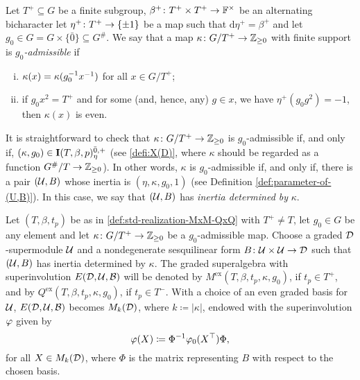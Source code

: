 
\begin{defi}\label{defi:odd-D-kappa-g_0-admissible}
    Let $T^+ \subseteq G$ be a finite subgroup, $\beta^+\colon T^+\times T^+ \to \mathbb{F}^\times$ be an alternating bicharacter let $\eta^+\colon T^+ \to \{ \pm 1 \}$ be a map such that $\mathrm{d}\eta^+ = \beta^+$ and let $g_0 \in G = G \times \{ \bar 0 \} \subseteq G^\#$. 
    We say that a map $\kappa\colon G/T^+ \to \mathbb{Z}_{\geq 0}$ with finite support is \emph{$g_0$-admissible} if
	\begin{enumerate}[(i)]
		\item $\kappa(x) = \kappa(g_0^{-1} x^{-1})$ for all $x \in G/T^+$;
		\item if $g_0 x^2 = T^+$ and 
		for some (and, hence, any) $g\in x$, we have $\eta^+(g_0g^2) = -1$, then $\kappa (x)$ is even.
	\end{enumerate}
\end{defi}

It is straightforward to check that $\kappa\colon G/T^+ \to \mathbb{Z}_{\geq 0}$ is $g_0$-admissible if, and only if, $(\kappa, g_0) \in \mathbf{I}(T,\beta,p)^{{\bar{0}}, +}_\eta$ (see \cref{defi:X(D)}, where $\kappa$ should be regarded as a function $G^\#/T \to \mathbb{Z}_{\geq 0}$). 
In other words, $\kappa$ is $g_0$-admissible if, and only if, there is a pair $(\mathcal U, B)$ whose inertia is $(\eta, \kappa, g_0, 1)$ (see Definition \ref{def:parameter-of-(U,B)}). 
In this case, we say that $(\mathcal U, B)$ has \emph{inertia determined by} $\kappa$. 

\begin{defi}\label{def:model-grd-MxM-odd-or-QxQ}
    Let $(T, \beta, t_p)$ be as in \cref{def:std-realization-MxM-QxQ} with $T^+ \neq T$, 
    let $g_0 \in G$ be any element and
    let $\kappa\colon G/T^+ \to \mathbb{Z}_{\geq 0}$ be a $g_0$-admissible map.
    Choose a graded $\mathcal{D}$-supermodule $\mathcal U$ and a nondegenerate sesquilinear form $B\colon \mathcal U\times \mathcal U \to \mathcal{D}$ such that $(\mathcal U, B)$ has inertia determined by $\kappa$. 
    The graded superalgebra with superinvolution $E(\mathcal{D}, \mathcal U, \mathcal B)$ will be denoted by $M^{\mathrm{ex}}(T, \beta, t_p, \kappa, g_0)$, if $t_p \in T^+$, and by $Q^{\mathrm{ex}}(T, \beta, t_p, \kappa, g_0)$, if $t_p \in T^-$. 
    With a choice of an even graded basis for $\mathcal U$, $E(\mathcal{D}, \mathcal U, \mathcal B)$ becomes $M_k (\mathcal{D})$, where $k \coloneqq |\kappa|$, endowed with the superinvolution $\varphi$ given by 
    \[
        \varphi(X) \coloneqq \Phi^{-1} \varphi_0(X^{\top}) \Phi,
    \]
    for all $X \in M_k(\mathcal{D})$, where $\Phi$ is the matrix representing $B$ with respect to the chosen basis. 
\end{defi}

